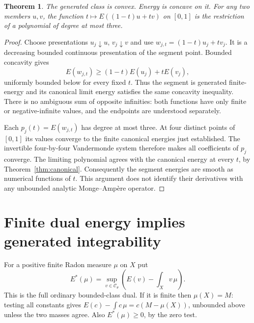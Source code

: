 \documentclass[11pt]{article}
\newtheorem{theorem}{Theorem}
\begin{document}
\begin{theorem}\label{thm:segments}
The generated class is convex. Energy is concave on it. For any two
members $u,v$, the function $t\mapsto E((1-t)u+tv)$ on $[0,1]$ is
the restriction of a polynomial of degree at most three.
\end{theorem}
\begin{proof}
Choose presentations $u_j\downarrow u$, $v_j\downarrow v$ and
use $w_{j,t}=(1-t)u_j+tv_j$. It is a decreasing bounded continuous
presentation of the segment point. Bounded concavity gives
\[
 E(w_{j,t})\geq(1-t)E(u_j)+tE(v_j),
\]
uniformly bounded below for every fixed $t$. Thus the segment is
generated finite-energy and its canonical limit energy satisfies
the same concavity inequality. There is no ambiguous sum of opposite
infinities: both functions have only finite or negative-infinite values,
and the endpoints are understood separately.

Each $p_j(t)=E(w_{j,t})$ has degree at most three. At four distinct
points of $[0,1]$ its values converge to the finite canonical energies
just established. The invertible four-by-four Vandermonde system
therefore makes all coefficients of $p_j$ converge. The limiting
polynomial agrees with the canonical energy at every $t$, by
Theorem~\ref{thm:canonical}. Consequently the segment energies are
smooth as numerical functions of $t$. This argument does not identify
their derivatives with any unbounded analytic Monge--Amp\`ere operator.
\end{proof}

\section{Finite dual energy implies generated integrability}
For a positive finite Radon measure $\mu$ on $X$ put
\[
 E^*(\mu)=\sup_{v\in\mathcal C_\theta}
                      \left(E(v)-\int_Xv\,\mu\right).
\]
This is the full ordinary bounded-class dual. If it is finite then
$\mu(X)=M$: testing all constants gives
$E(c)-\int c\,\mu=c(M-\mu(X))$, unbounded above unless the
two masses agree. Also $E^*(\mu)\geq0$, by the zero test.
\end{document}
